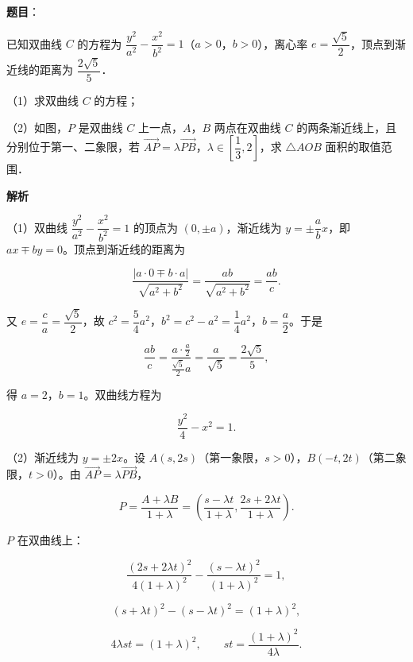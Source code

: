 \begin{answer}

\textbf{题目}：

已知双曲线 $C$ 的方程为 $\dfrac{y^2}{a^2}-\dfrac{x^2}{b^2}=1$（$a>0$，$b>0$），离心率 $e=\dfrac{\sqrt5}2$，顶点到渐近线的距离为 $\dfrac{2\sqrt5}5$．

（1）求双曲线 $C$ 的方程；

（2）如图，$P$ 是双曲线 $C$ 上一点，$A$，$B$ 两点在双曲线 $C$ 的两条渐近线上，且分别位于第一、二象限，若 $\overrightarrow{AP}=\lambda\overrightarrow{PB}$，$\lambda\in\left[\dfrac13,2\right]$，求 $\triangle AOB$ 面积的取值范围．
\nopagebreak[4]
\begin{center}\end{center}
\nopagebreak[4]
\textbf{解析}

（1）双曲线 $\dfrac{y^2}{a^2}-\dfrac{x^2}{b^2}=1$ 的顶点为 $(0,\pm a)$，渐近线为 $y=\pm\dfrac abx$，即 $ax\mp by=0$。顶点到渐近线的距离为

\nopagebreak[4]
\[\frac{|a\cdot0\mp b\cdot a|}{\sqrt{a^2+b^2}}=\frac{ab}{\sqrt{a^2+b^2}}=\frac{ab}c.\]

又 $e=\dfrac ca=\dfrac{\sqrt5}2$，故 $c^2=\dfrac54a^2$，$b^2=c^2-a^2=\dfrac14a^2$，$b=\dfrac a2$。于是

\nopagebreak[4]
\[\frac{ab}c=\frac{a\cdot\frac a2}{\frac{\sqrt5}2a}=\frac a{\sqrt5}=\frac{2\sqrt5}5,\]

得 $a=2$，$b=1$。双曲线方程为

\nopagebreak[4]
\[\frac{y^2}4-x^2=1.\]

（2）渐近线为 $y=\pm2x$。设 $A(s,2s)$（第一象限，$s>0$），$B(-t,2t)$（第二象限，$t>0$）。由 $\overrightarrow{AP}=\lambda\overrightarrow{PB}$，

\nopagebreak[4]
\[P=\frac{A+\lambda B}{1+\lambda}
=\left(\frac{s-\lambda t}{1+\lambda},\frac{2s+2\lambda t}{1+\lambda}\right).\]

$P$ 在双曲线上：

\nopagebreak[4]
\[\frac{(2s+2\lambda t)^2}{4(1+\lambda)^2}
-\frac{(s-\lambda t)^2}{(1+\lambda)^2}=1,\]

\nopagebreak[4]
\[(s+\lambda t)^2-(s-\lambda t)^2=(1+\lambda)^2,\]

\nopagebreak[4]
\[4\lambda st=(1+\lambda)^2,\qquad st=\frac{(1+\lambda)^2}{4\lambda}.\]


\end{answer}
